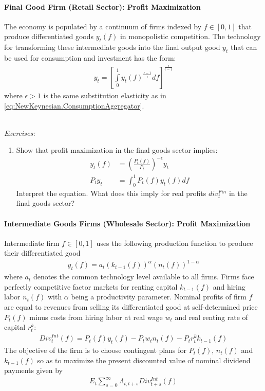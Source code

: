\paragraph{Final Good Firm (Retail Sector): Profit Maximization}
The economy is populated by a continuum of firms indexed by $f \in [0,1]$ that produce differentiated goods $y_t(f)$ in monopolistic competition.
The technology for transforming these intermediate goods into the final output good $y_t$ that can be used for consumption and investment
  has the \textcite{Dixit.Stiglitz_1977_MonopolisticCompetitionOptimum} form:
\begin{align}
y_t = \left[\int\limits_0^1 y_t(f)^{\frac{\epsilon-1}{\epsilon}}df\right]^{\frac{\epsilon}{\epsilon-1}} \label{eq:NewKeynesian.Firms.Aggregator}
\end{align}
where $\epsilon>1$ is the same substitution elasticity as in \eqref{eq:NewKeynesian.ConsumptionAggregator}.

~\\\noindent\emph{Exercises:}
\begin{enumerate}[resume]
\item Show that profit maximization in the final goods sector implies:
\begin{align}
y_t(f) &= \left(\frac{P_t(f)}{P_t}\right)^{-\epsilon} y_t \label{eq:NewKeynesian.Firms.Demand}
\\
P_t y_t &= \int_{0}^{1} P_t(f) y_t(f) df \label{eq:NewKeynesian.Firms.ZeroProfit}
\end{align}
Interpret the equation.
What does this imply for real profits $div_t^{Fin}$ in the final goods sector?
\end{enumerate}

\paragraph{Intermediate Goods Firms (Wholesale Sector): Profit Maximization}
Intermediate firm $f\in[0,1]$ uses the following production function to produce their differentiated good
\begin{align}
y_t(f) = a_t (k_{t-1}(f))^\alpha (n_t(f))^{1-\alpha} \label{eq:NewKeynesian.IntermediateFirms.ProductionFunction}
\end{align}
where $a_t$ denotes the common technology level available to all firms.
Firms face perfectly competitive factor markets for renting capital $k_{t-1}(f)$ and hiring labor $n_t(f)$ with $\alpha$ being a productivity parameter.
Nominal profits of firm $f$ are equal to revenues from selling its differentiated good at self-determined price $P_t(f)$
  minus costs from hiring labor at real wage $w_t$ and real renting rate of capital $r^k_t$:
\begin{align}
{Div}^{Int}_t(f) = P_t(f) y_t(f) - P_t w_t n_t(f) - P_t r^k_t k_{t-1}(f) \label{eq:NewKeynesian.Firms.Profits}
\end{align}
The objective of the firm is to choose contingent plans for $P_t(f)$, $n_t(f)$ and $k_{t-1}(f)$
  so as to maximize the present discounted value of nominal dividend payments given by
\begin{align*}
E_t \sum_{s=0}^{\infty} \Lambda_{t,t+s} Div^{Int}_{t+s}(f)
\end{align*}

